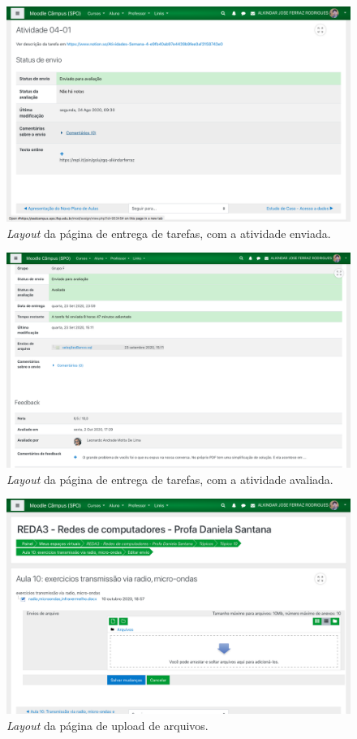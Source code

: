 \documentclass[11pt]{article}
\begin{document}
\begin{figure}[htbp]
\centering
\includegraphics[width=.9\linewidth]{./media/entrega_2.png}
\caption[\emph{Layout}]{\label{fig:org1c75e51}\emph{Layout} da página de entrega de tarefas, com a atividade enviada.}
\end{figure}
\begin{figure}[htbp]
\centering
\includegraphics[width=.9\linewidth]{./media/entrega_3.png}
\caption[\emph{Layout}]{\label{fig:org908988e}\emph{Layout} da página de entrega de tarefas, com a atividade avaliada.}
\end{figure}
\begin{figure}[htbp]
\centering
\includegraphics[width=.9\linewidth]{./media/arquivos_1.png}
\caption[\emph{Layout}]{\label{fig:orga777d26}\emph{Layout} da página de upload de arquivos.}
\end{figure}
\end{document}
